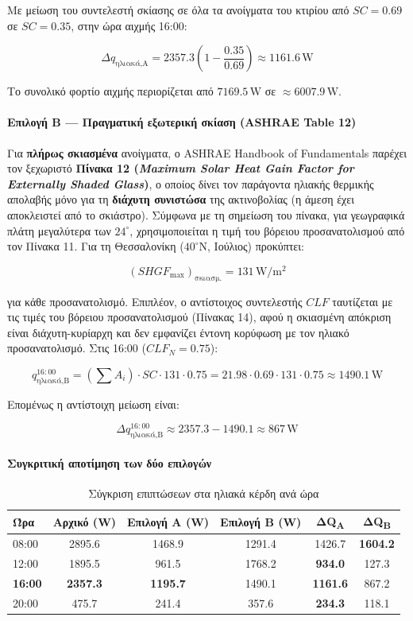 \documentclass[12pt,a4paper]{article}
\begin{document}
Με μείωση του συντελεστή σκίασης σε όλα τα ανοίγματα του κτιρίου από \(SC=0.69\)
σε \(SC=0.35\), στην ώρα αιχμής 16:00:

\[
\Delta q_{\text{ηλιακά,A}} =
2357.3\left(1-\frac{0.35}{0.69}\right)
\approx 1161.6\,\mathrm{W}
\]

Το συνολικό φορτίο αιχμής περιορίζεται από \(7169.5\,\mathrm{W}\) σε
\(\approx 6007.9\,\mathrm{W}\).

\paragraph{Επιλογή Β — Πραγματική εξωτερική σκίαση (ASHRAE Table 12)}

Για \textbf{πλήρως σκιασμένα} ανοίγματα, ο ASHRAE Handbook of Fundamentals
παρέχει τον ξεχωριστό \textbf{Πίνακα 12 (\textit{Maximum Solar Heat Gain Factor
for Externally Shaded Glass})}, ο οποίος δίνει τον παράγοντα ηλιακής θερμικής
απολαβής μόνο για τη \textbf{διάχυτη συνιστώσα} της ακτινοβολίας (η άμεση έχει
αποκλειστεί από το σκιάστρο). Σύμφωνα με τη σημείωση του πίνακα, για γεωγραφικά
πλάτη μεγαλύτερα των \(24^\circ\), χρησιμοποιείται η τιμή του βόρειου
προσανατολισμού από τον Πίνακα 11. Για τη Θεσσαλονίκη (\(40^\circ\mathrm{N}\),
Ιούλιος) προκύπτει:

\[
(SHGF_{\max})_{\text{σκιασμ.}} = 131\,\mathrm{W/m^2}
\]

για κάθε προσανατολισμό. Επιπλέον, ο αντίστοιχος συντελεστής \(CLF\) ταυτίζεται
με τις τιμές του βόρειου προσανατολισμού (Πίνακας 14), αφού η σκιασμένη
απόκριση είναι διάχυτη-κυρίαρχη και δεν εμφανίζει έντονη κορύφωση με τον
ηλιακό προσανατολισμό. Στις 16:00 (\(CLF_N = 0.75\)):

\[
q_{\text{ηλιακά,Β}}^{16:00}
= \left(\sum A_i\right) \cdot SC \cdot 131 \cdot 0.75
= 21.98 \cdot 0.69 \cdot 131 \cdot 0.75
\approx 1490.1\,\mathrm{W}
\]

Επομένως η αντίστοιχη μείωση είναι:

\[
\Delta q_{\text{ηλιακά,B}}^{16:00}
\approx 2357.3 - 1490.1
\approx 867\,\mathrm{W}
\]

\paragraph{Συγκριτική αποτίμηση των δύο επιλογών}

\begin{table}[H]
\centering
\small
\caption{Σύγκριση επιπτώσεων στα ηλιακά κέρδη ανά ώρα}
\begin{tabular}{lccccc}
\toprule
\textbf{Ώρα} & \textbf{Αρχικό (W)} & \textbf{Επιλογή Α (W)} & \textbf{Επιλογή Β (W)} & \textbf{ΔQ\textsubscript{Α}} & \textbf{ΔQ\textsubscript{Β}} \\
\midrule
08:00 & 2895.6 & 1468.9 & 1291.4 & 1426.7 & \textbf{1604.2} \\
12:00 & 1895.5 & 961.5  & 1768.2 & \textbf{934.0}  & 127.3 \\
\textbf{16:00} & \textbf{2357.3} & \textbf{1195.7} & 1490.1 & \textbf{1161.6} & 867.2 \\
20:00 & 475.7  & 241.4  & 357.6  & \textbf{234.3}  & 118.1 \\
\bottomrule
\end{tabular}
\end{table}
\end{document}
